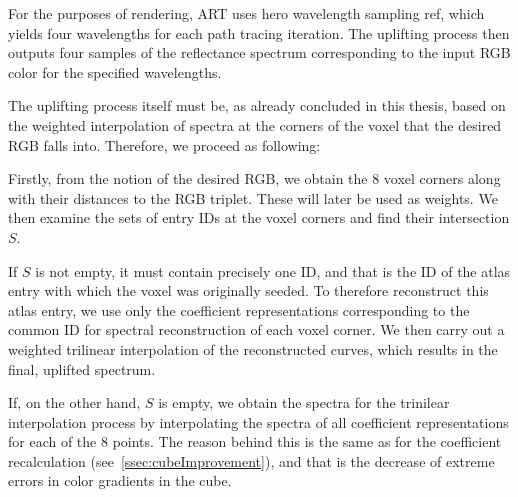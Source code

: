 For the purposes of rendering, ART uses hero wavelength sampling ref, which yields four wavelengths for each path tracing iteration. The uplifting process then outputs four samples of the reflectance spectrum corresponding to the input RGB color for the specified wavelengths.

The uplifting process itself must be, as already concluded in this thesis, based on the weighted interpolation of spectra at the corners of the voxel that the desired RGB falls into. Therefore, we proceed as following:

Firstly, from the notion of the desired RGB, we obtain the 8 voxel corners along with their distances to the RGB triplet. These will later be used as weights. We then examine the sets of entry IDs at the voxel corners and find their intersection $S$.

If $S$ is not empty, it must contain precisely one ID, and that is the ID of the atlas entry with which the voxel was originally seeded. To therefore reconstruct this atlas entry, we use only the coefficient representations corresponding to the common ID for spectral reconstruction of each voxel corner. We then carry out a weighted trilinear interpolation of the reconstructed curves, which results in the final, uplifted spectrum.

If, on the other hand, $S$ is empty, we obtain the spectra for the trinilear interpolation process by interpolating the spectra of all coefficient representations for each of the 8 points. The reason behind this is the same as for the coefficient recalculation (see~\cref{ssec:cubeImprovement}), and that is the decrease of extreme errors in color gradients in the cube.
